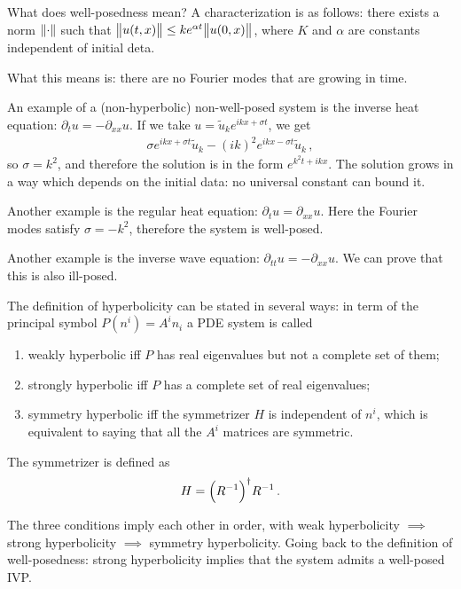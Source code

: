 \documentclass[main.tex]{subfiles}
\begin{document}
What does well-posedness mean?
A characterization is as follows: there exists a norm \(\norm{\cdot}\) such that \(\norm{u(t, x)} \leq k e^{\alpha t} \norm{u(0, x)}\), where \(K\) and \(\alpha \) are constants independent of initial deta. 

What this means is: there are no Fourier modes that are growing in time. 

An example of a (non-hyperbolic) non-well-posed system is the inverse heat equation: \(\partial_{t} u = - \partial_{xx} u\). 
If we take \(u = \widetilde{u}_k e^{ikx + \sigma t}\), we get 
%
\begin{align}
\sigma e^{ikx + \sigma t} \widetilde{u}_k - (ik)^2 e^{ikx - \sigma t} \widetilde{u}_k
\,,
\end{align}
%
so \(\sigma = k^2\), and therefore the solution is in the form \(e^{k^2 t + ik x}\). 
The solution grows in a way which depends on the initial data: no universal constant can bound it. 

Another example is the regular heat equation: \(\partial_{t} u = \partial_{xx} u \). Here the Fourier modes satisfy \(\sigma = - k^2\), therefore the system is well-posed. 

Another example is the inverse wave equation: \(\partial_{tt} u = - \partial_{xx} u\). We can prove that this is also ill-posed. 

The definition of hyperbolicity can be stated in several ways: in term of the principal symbol \(P(n^i) = A^{i} n_i\) a PDE system is called 
\begin{enumerate}
    \item weakly hyperbolic iff \(P\) has real eigenvalues but not a complete set of them;
    \item strongly hyperbolic iff \(P\) has a complete set of real eigenvalues;
    \item symmetry hyperbolic iff the symmetrizer \(H\) is independent of \(n^i\), which is equivalent to saying that all the \(A^{i}\) matrices are symmetric. 
\end{enumerate}

The symmetrizer is defined as 
%
\begin{align}
H = \qty(R^{-1})^\dag R^{-1}
\,.
\end{align}

The three conditions imply each other in order, with weak hyperbolicity \(\implies\) strong hyperbolicity \(\implies\) symmetry hyperbolicity. 
Going back to the definition of well-posedness: strong hyperbolicity implies that the system admits a well-posed IVP. 
\end{document}

